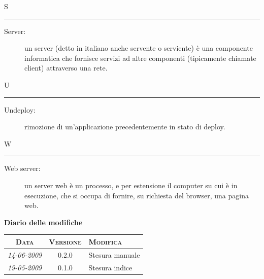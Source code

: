 \documentclass[11pt,a4paper]{article}
\newcommand{\modifiche} 
{
\newpage
\begin{center}
\textbf{Diario delle modifiche} \\
\bigskip
\begin{tabular}{|c|c|p{0.62\textwidth}|}
\hline
\textsc{Data} & \textsc{Versione} & \textsc{Modifica} \\
\hline
\hline
\textit{14-06-2009} & 0.2.0 & Stesura manuale\\
\hline
\textit{19-05-2009} & 0.1.0 & Stesura indice\\
\hline
\end{tabular}
\end{center}
}
\begin{document}
\bigskip
\Huge S \bigskip
\hrule
\smallskip
\normalsize
\begin{description}
	\item[Server:] un server (detto in italiano anche servente o serviente) è una componente informatica che fornisce servizi ad altre componenti (tipicamente chiamate client) attraverso una rete.
\end{description}
\bigskip
\Huge U \bigskip
\hrule
\smallskip
\normalsize
\begin{description}
	\item[Undeploy:] rimozione di un'applicazione precedentemente in stato di deploy.
\end{description}
\bigskip
\Huge W \bigskip
\hrule
\smallskip
\normalsize
\begin{description}
	\item[Web server:] un server web è un processo, e per estensione il computer su cui è in esecuzione, che si occupa di fornire, su richiesta del browser, una pagina web.
\end{description}
\modifiche
\end{document}
